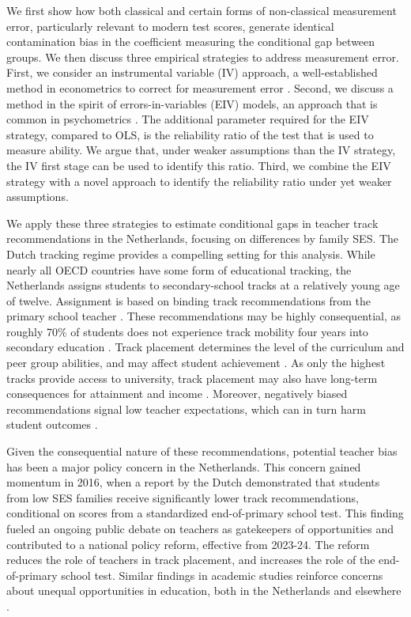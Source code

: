 We first show how both classical and certain forms of non-classical measurement error, particularly relevant to modern test scores, generate identical contamination bias in the coefficient measuring the conditional gap between groups. We then discuss three empirical strategies to address measurement error. First, we consider an instrumental variable (IV) approach, a well-established method in econometrics to correct for measurement error \citep{hausman2001mismeasured}. Second, we discuss a method in the spirit of errors-in-variables (EIV) models, an approach that is common in psychometrics \citep{fuller2009measurement}. The additional parameter required for the EIV strategy, compared to OLS, is the reliability ratio of the test that is used to measure ability. We argue that, under weaker assumptions than the IV strategy, the IV first stage can be used to identify this ratio. Third, we combine the EIV strategy with a novel approach to identify the reliability ratio under yet weaker assumptions. 

We apply these three strategies to estimate conditional gaps in teacher track recommendations in the Netherlands, focusing on differences by family SES. The Dutch tracking regime provides a compelling setting for this analysis. While nearly all OECD countries have some form of educational tracking, the Netherlands assigns students to secondary-school tracks at a relatively young age of twelve. Assignment is based on binding track recommendations from the primary school teacher \citep{wvo2014}. These recommendations may be highly consequential, as roughly 70\% of students does not experience track mobility four years into secondary education \citep{deree2023quality}. Track placement determines the level of the curriculum and peer group abilities, and may affect student achievement \citep{matthewes2021better}. As only the highest tracks provide access to university, track placement may also have long-term consequences for attainment and income \citep{dustmann2017long,borghans2019long}. Moreover, negatively biased recommendations signal low teacher expectations, which can in turn harm student outcomes \citep{carlana2019implicit,papageorge2020teacher}. 

Given the consequential nature of these recommendations, potential teacher bias has been a major policy concern in the Netherlands. This concern gained momentum in 2016, when a report by the Dutch \citet{inspectorate2016} demonstrated that students from low SES families receive significantly lower track recommendations, conditional on scores from a standardized end-of-primary school test. This finding fueled an ongoing public debate on teachers as gatekeepers of opportunities and contributed to a national policy reform, effective from 2023-24. The reform reduces the role of teachers in track placement, and increases the role of the end-of-primary school test. Similar findings in academic studies reinforce concerns about unequal opportunities in education, both in the Netherlands \citep{zumbuehl2025can} and elsewhere \citep{carlana2022implicit,falk2023mentoring}.

